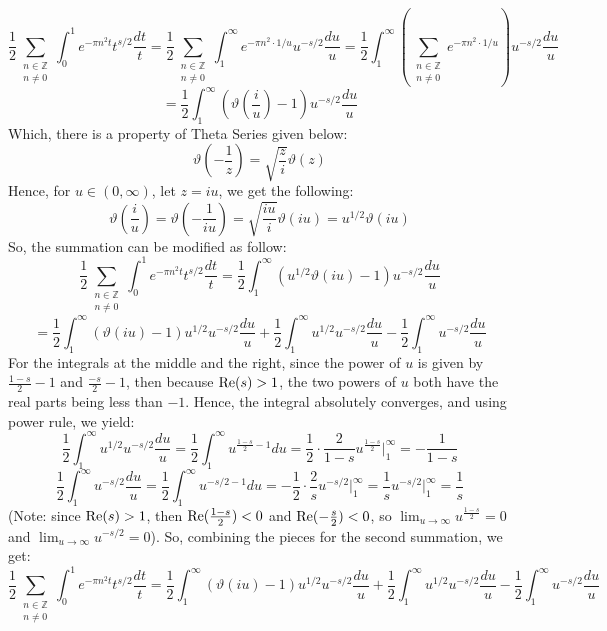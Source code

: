 \documentclass{article}
\begin{document}
$$\frac{1}{2}\sum_{\substack{n\in\mathbb{Z}\\n\neq 0}}\int_{0}^{1}e^{-\pi n^2t}t^{s/2}\frac{dt}{t} = \frac{1}{2}\sum_{\substack{n\in\mathbb{Z}\\n\neq 0}}\int_{1}^{\infty}e^{-\pi n^2\cdot 1/u}u^{-s/2}\frac{du}{u} = \frac{1}{2}\int_{1}^{\infty}\left(\sum_{\substack{n\in\mathbb{Z}\\n\neq 0}}e^{-\pi n^2\cdot 1/u}\right)u^{-s/2}\frac{du}{u}$$
$$ = \frac{1}{2}\int_{1}^{\infty}\left(\vartheta\left(\frac{i}{u}\right)-1\right)u^{-s/2}\frac{du}{u}$$
Which, there is a property of Theta Series given below:
$$\vartheta\left(-\frac{1}{z}\right)=\sqrt{\frac{z}{i}}\vartheta(z)$$
Hence, for $u\in(0,\infty)$, let $z=iu$, we get the following:
$$\vartheta\left(\frac{i}{u}\right)=\vartheta\left(-\frac{1}{iu}\right) = \sqrt{\frac{iu}{i}}\vartheta(iu) = u^{1/2}\vartheta(iu)$$
So, the summation can be modified as follow:
$$\frac{1}{2}\sum_{\substack{n\in\mathbb{Z}\\n\neq 0}}\int_{0}^{1}e^{-\pi n^2t}t^{s/2}\frac{dt}{t} = \frac{1}{2}\int_{1}^{\infty}\left(u^{1/2}\vartheta(iu)-1\right)u^{-s/2}\frac{du}{u}$$
$$ = \frac{1}{2}\int_{1}^{\infty}(\vartheta(iu)-1)u^{1/2}u^{-s/2}\frac{du}{u} + \frac{1}{2}\int_{1}^{\infty}u^{1/2}u^{-s/2}\frac{du}{u}-\frac{1}{2}\int_{1}^{\infty}u^{-s/2}\frac{du}{u}$$
For the integrals at the middle and the right, since the power of $u$ is given by $\frac{1-s}{2}-1$ and $\frac{-s}{2}-1$, then because $\textmd{Re}(s)>1$, the two powers of $u$ both have the real parts being less than $-1$. Hence, the integral absolutely converges, and using power rule, we yield:
$$\frac{1}{2}\int_{1}^{\infty}u^{1/2}u^{-s/2}\frac{du}{u} = \frac{1}{2}\int_{1}^{\infty}u^{\frac{1-s}{2}-1}du = \frac{1}{2}\cdot\frac{2}{1-s}u^{\frac{1-s}{2}}\bigg|_{1}^{\infty} = -\frac{1}{1-s}$$
$$\frac{1}{2}\int_{1}^{\infty}u^{-s/2}\frac{du}{u}=\frac{1}{2}\int_{1}^{\infty}u^{-s/2-1}du = -\frac{1}{2}\cdot\frac{2}{s}u^{-s/2}\bigg|_{1}^{\infty} = \frac{1}{s}u^{-s/2}\bigg|_{1}^{\infty} = \frac{1}{s}$$
(Note: since $\textmd{Re}(s)>1$, then $\textmd{Re}(\frac{1-s}{2})<0$ and $\textmd{Re}(-\frac{s}{2})<0$, so $\lim_{u\rightarrow\infty}u^{\frac{1-s}{2}}=0$ and $\lim_{u\rightarrow\infty}u^{-s/2}=0$).
So, combining the pieces for the second summation, we get:
$$\frac{1}{2}\sum_{\substack{n\in\mathbb{Z}\\n\neq 0}}\int_{0}^{1}e^{-\pi n^2t}t^{s/2}\frac{dt}{t} = \frac{1}{2}\int_{1}^{\infty}(\vartheta(iu)-1)u^{1/2}u^{-s/2}\frac{du}{u} + \frac{1}{2}\int_{1}^{\infty}u^{1/2}u^{-s/2}\frac{du}{u}-\frac{1}{2}\int_{1}^{\infty}u^{-s/2}\frac{du}{u}$$
\end{document}
